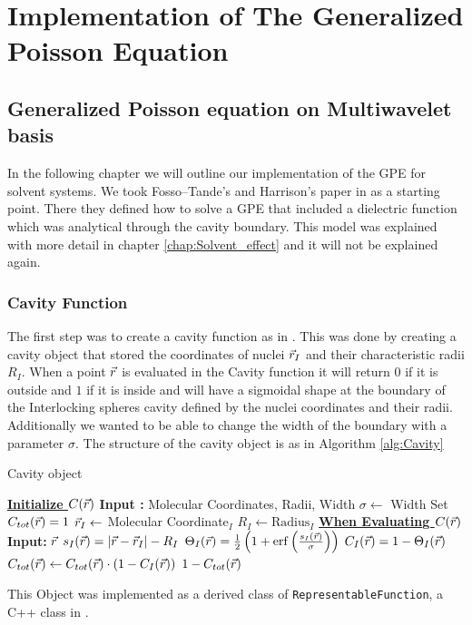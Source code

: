\documentclass[../master_thesis.tex]{subfiles}
\begin{document}
\chapter{Implementation of The Generalized Poisson Equation}\label{chap:implementation}
\section{Generalized Poisson equation on Multiwavelet basis}
In the following chapter we will outline our implementation of the \ac{GPE}
for solvent systems. We took Fosso--Tande's and Harrison's
paper in \cite{FossoTande:2013ka} as a starting point. There they defined
how to solve a \ac{GPE} that included a dielectric function which was analytical
through the cavity boundary. This model was explained with more detail in chapter \ref{chap:Solvent_effect} and
it will not be explained again.

\subsection{Cavity Function}
The first step was to create a cavity function as in \cite{FossoTande:2013ka}.
This was done by creating a cavity object that stored the coordinates of nuclei
$\vec{r}_I$ and their characteristic radii $R_I$. When a point $\vec{r}$ is evaluated
in the Cavity function it will return $0$ if it is outside and $1$ if
it is inside  and will have a sigmoidal shape at the boundary  of the
Interlocking spheres cavity defined by the nuclei coordinates and their radii.
Additionally we wanted to be able to change the width of the
boundary with a parameter $\sigma$. The structure of the cavity object is as
in Algorithm \ref{alg:Cavity}

\begin{algorithm}
  \caption{Cavity object}\label{alg:Cavity}
  \begin{algorithmic}
    \STATE \underline{\textbf{Initialize $C(\vec{r})$}}
    \STATE \textbf{Input :} Molecular Coordinates, Radii, Width
    \STATE $\sigma \leftarrow $ Width
    \STATE Set $C_{tot}(\vec{r}) = 1$
     \STATE $\vec{r}_I \leftarrow $ Molecular Coordinate$_I$
     \STATE $R_I \leftarrow \text{Radius}_I$
    \ENDFOR
    \STATE
    \STATE \underline{\textbf{When Evaluating $C(\vec{r})$}}
    \STATE \textbf{Input: } $\vec{r}$
      \STATE $s_I(\vec{r}) = \abs{\vec{r} - \vec{r}_I} - R_I$
      \STATE $\Theta_I(\rvec) = \frac{1}{2}\left(1 + \erf\left(\frac{s_I(\rvec)}{\sigma}\right)\right)$
      \STATE $ C_I(\vec{r}) = 1 -\Theta_I(\vec{r}) $
      \STATE $ C_{tot}(\vec{r}) \leftarrow C_{tot}(\vec{r}) \cdot (1 - C_{I}(\vec{r}))$
    \ENDFOR
    \RETURN $ 1 - C_{tot}(\vec{r})$
  \end{algorithmic}
\end{algorithm}
This Object was implemented as a derived class of \verb!RepresentableFunction!,
a C++ class in \mrchem.
\end{document}
